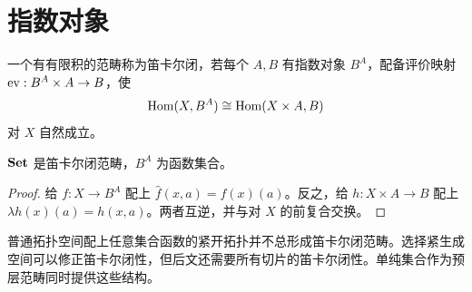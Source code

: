 \section{指数对象}
\begin{definition}[笛卡尔闭范畴]
一个有有限积的范畴称为笛卡尔闭，若每个 $A,B$ 有指数对象 $B^A$，配备评价映射 $\operatorname{ev}:B^A\times A\to B$，使
\[
\operatorname{Hom}(X,B^A)\cong\operatorname{Hom}(X\times A,B)
\]
对 $X$ 自然成立。
\end{definition}
\begin{proposition}
$\mathbf{Set}$ 是笛卡尔闭范畴，$B^A$ 为函数集合。
\end{proposition}
\begin{proof}
给 $f:X\to B^A$ 配上 $\widehat f(x,a)=f(x)(a)$。反之，给 $h:X\times A\to B$ 配上 $\lambda h(x)(a)=h(x,a)$。两者互逆，并与对 $X$ 的前复合交换。
\end{proof}
\begin{remark}
普通拓扑空间配上任意集合函数的紧开拓扑并不总形成笛卡尔闭范畴。选择紧生成空间可以修正笛卡尔闭性，但后文还需要所有切片的笛卡尔闭性。单纯集合作为预层范畴同时提供这些结构。
\end{remark}

